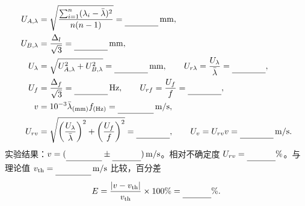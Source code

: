 \documentclass[UTF8,a4paper,10pt,fontset=fandol]{ctexart}
\makeatletter
\newcommand{\Field}[2][1.7cm]{%
  \underline{\makebox[#1][c]{%
    \ifcsname expdata@#2\endcsname\csname expdata@#2\endcsname\else\strut\fi}}}
\newcommand{\MathField}[2][1.7cm]{\mbox{\Field[#1]{#2}}}
\makeatother
\begin{document}
\begin{align*}
U_{A,\lambda}&=\sqrt{\frac{\sum_{i=1}^{n}(\lambda_i-\bar\lambda)^2}{n(n-1)}}
  =\MathField[1.4cm]{phase_u_a}\,\mathrm{mm},\\
U_{B,\lambda}&=\frac{\Delta_l}{\sqrt3}=\MathField[1.4cm]{phase_u_b}\,\mathrm{mm},\\
U_\lambda&=\sqrt{U_{A,\lambda}^2+U_{B,\lambda}^2}
  =\MathField[1.4cm]{phase_u_lambda}\,\mathrm{mm},\qquad
U_{r\lambda}=\frac{U_\lambda}{\bar\lambda}
  =\MathField[1.4cm]{phase_u_r_lambda},\\
U_f&=\frac{\Delta_f}{\sqrt3}=\MathField[1.4cm]{phase_u_f}\,\mathrm{Hz},\qquad
U_{rf}=\frac{U_f}{f}=\MathField[1.4cm]{phase_u_r_f},\\
v&=10^{-3}\bar\lambda_{\mathrm{(mm)}} f_{\mathrm{(Hz)}}=\MathField[1.5cm]{phase_speed}\,\mathrm{m/s},\\
U_{rv}&=\sqrt{\left(\frac{U_\lambda}{\bar\lambda}\right)^2+
              \left(\frac{U_f}{f}\right)^2}
  =\MathField[1.4cm]{phase_u_r_v},\qquad
U_v=U_{rv}v=\MathField[1.4cm]{phase_u_v}\,\mathrm{m/s}.
\end{align*}
实验结果：$v=(\MathField[1.5cm]{phase_speed_result}\pm\MathField[1.2cm]{phase_u_v_result})\,\mathrm{m/s}$。相对不确定度 $U_{rv}=\MathField[1.2cm]{phase_u_r_v_percent}\%$。与理论值 $v_{\mathrm{th}}=\MathField[1.5cm]{phase_speed_theory}\,\mathrm{m/s}$ 比较，百分差
\begin{equation*}
E=\frac{|v-v_{\mathrm{th}}|}{v_{\mathrm{th}}}\times100\%
 =\MathField[1.2cm]{phase_error_percent}\%.
\end{equation*}
\end{document}
